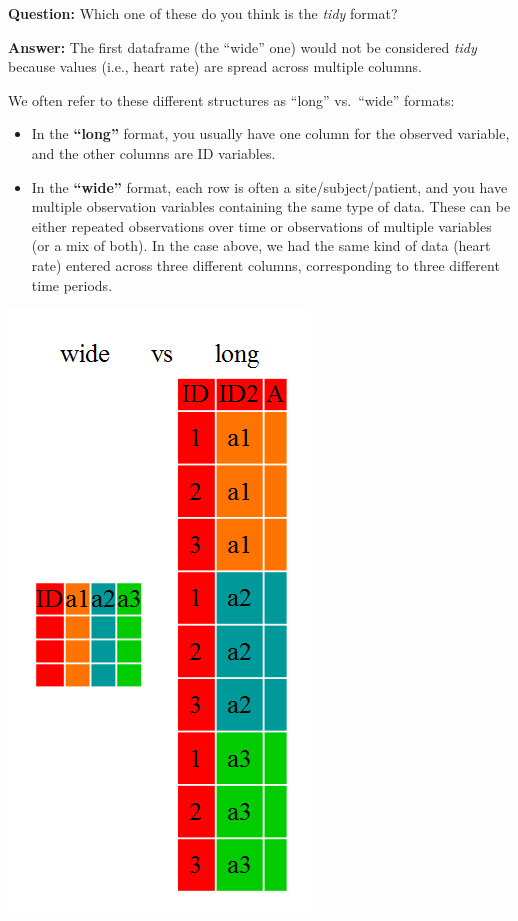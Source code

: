 \documentclass[
]{book}
\begin{document}
\textbf{Question:} Which one of these do you think is the \emph{tidy} format?

\textbf{Answer:} The first dataframe (the ``wide'' one) would not be considered \emph{tidy} because values (i.e., heart rate) are spread across multiple columns.

We often refer to these different structures as ``long'' vs.~``wide'' formats:

\begin{itemize}
\item
  In the \textbf{``long''} format, you usually have one column for the observed variable, and the other columns are ID variables.
\item
  In the \textbf{``wide''} format, each row is often a site/subject/patient, and you have multiple observation variables containing the same type of data. These can be either repeated observations over time or observations of multiple variables (or a mix of both). In the case above, we had the same kind of data (heart rate) entered across three different columns, corresponding to three different time periods.
\end{itemize}

\begin{center}\includegraphics[width=0.7\linewidth]{img/tidyr-fig1} \end{center}
\end{document}
